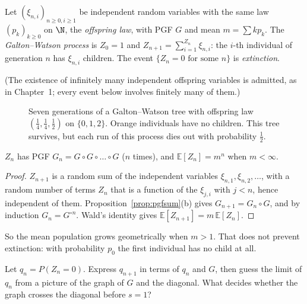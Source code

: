 \begin{definition}
Let $(\xi_{n,i})_{n\ge0,i\ge1}$ be independent random variables with the same law $(p_k)_{k\ge0}$ on $\N$, the
\emph{offspring law}, with PGF $G$ and mean $m=\sum kp_k$. The \emph{Galton--Watson process} is $Z_0=1$ and
$Z_{n+1}=\sum_{i=1}^{Z_n}\xi_{n,i}$: the $i$-th individual of generation $n$ has $\xi_{n,i}$ children. The event
$\{Z_n=0\text{ for some }n\}$ is \emph{extinction}.
\end{definition}

(The existence of infinitely many independent offspring variables is admitted, as in Chapter~1; every event
below involves finitely many of them.)

\begin{figure}[ht]
\centering
{}
\caption{Seven generations of a Galton--Watson tree with offspring law $(\frac14,\frac14,\frac12)$ on $\{0,1,2\}$. Orange
individuals have no children. This tree survives, but each run of this process dies out with probability $\frac12$.}
\label{fig:gwtree}
\end{figure}

\begin{proposition}\label{prop:gwgen}
$Z_n$ has PGF $G_n=G\circ G\circ\dots\circ G$ ($n$ times), and $\mathbb E[Z_n]=m^n$ when $m<\infty$.
\end{proposition}
\begin{proof}
$Z_{n+1}$ is a random sum of the independent variables $\xi_{n,1},\xi_{n,2},\ldots$, with a random number of terms
$Z_n$ that is a function of the $\xi_{j,i}$ with $j<n$, hence independent of them. Proposition~\ref{prop:pgfsum}(b) gives
$G_{n+1}=G_n\circ G$, and by induction $G_n=G^{\circ n}$. Wald's identity gives $\mathbb E[Z_{n+1}]=m\,\mathbb E[Z_n]$.
\end{proof}

So the mean population grows geometrically when $m>1$. That does not prevent extinction: with probability $p_0$ the
first individual has no child at all.

\begin{think}
Let $q_n=P(Z_n=0)$. Express $q_{n+1}$ in terms of $q_n$ and $G$, then guess the limit of $q_n$ from a picture of
the graph of $G$ and the diagonal. What decides whether the graph crosses the diagonal before $s=1$?
\end{think}

